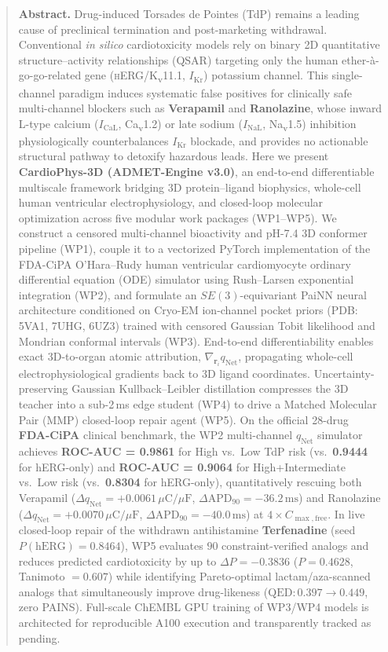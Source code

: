 \documentclass[10pt,twocolumn,letterpaper]{article}
\newcommand{\qnet}{q_{\mathrm{Net}}}
\newcommand{\cmax}{C_{\max,\mathrm{free}}}
\newcommand{\apd}{\mathrm{APD}_{90}}
\begin{document}
\begin{@twocolumnfalse}
  \begin{quote}
    \small\noindent\textbf{\color{InkSlate}Abstract.}
    Drug-induced Torsades de Pointes (TdP) remains a leading cause of preclinical termination and post-marketing withdrawal. Conventional \textit{in silico} cardiotoxicity models rely on binary 2D quantitative structure--activity relationships (QSAR) targeting only the human ether-\`{a}-go-go-related gene (\textsc{hERG}/K\textsubscript{v}11.1, $I_{\mathrm{Kr}}$) potassium channel. This single-channel paradigm induces systematic false positives for clinically safe multi-channel blockers such as \textbf{Verapamil} and \textbf{Ranolazine}, whose inward L-type calcium ($I_{\mathrm{CaL}}$, Ca\textsubscript{v}1.2) or late sodium ($I_{\mathrm{NaL}}$, Na\textsubscript{v}1.5) inhibition physiologically counterbalances $I_{\mathrm{Kr}}$ blockade, and provides no actionable structural pathway to detoxify hazardous leads. Here we present \textbf{CardioPhys-3D (ADMET-Engine v3.0)}, an end-to-end differentiable multiscale framework bridging 3D protein--ligand biophysics, whole-cell human ventricular electrophysiology, and closed-loop molecular optimization across five modular work packages (WP1--WP5). We construct a censored multi-channel bioactivity and pH-7.4 3D conformer pipeline (WP1), couple it to a vectorized PyTorch implementation of the FDA-CiPA O'Hara--Rudy human ventricular cardiomyocyte ordinary differential equation (ODE) simulator using Rush--Larsen exponential integration (WP2), and formulate an $SE(3)$-equivariant PaiNN neural architecture conditioned on Cryo-EM ion-channel pocket priors (PDB: 5VA1, 7UHG, 6UZ3) trained with censored Gaussian Tobit likelihood and Mondrian conformal intervals (WP3). End-to-end differentiability enables exact 3D-to-organ atomic attribution, $\nabla_{\mathbf{r}_i}\qnet$, propagating whole-cell electrophysiological gradients back to 3D ligand coordinates. Uncertainty-preserving Gaussian Kullback--Leibler distillation compresses the 3D teacher into a sub-2\,ms edge student (WP4) to drive a Matched Molecular Pair (MMP) closed-loop repair agent (WP5). On the official 28-drug \textbf{FDA-CiPA} clinical benchmark, the WP2 multi-channel $\qnet$ simulator achieves \textbf{ROC-AUC = 0.9861} for High vs.\ Low TdP risk (vs.\ \textbf{0.9444} for hERG-only) and \textbf{ROC-AUC = 0.9064} for High+Intermediate vs.\ Low risk (vs.\ \textbf{0.8304} for hERG-only), quantitatively rescuing both Verapamil ($\Delta\qnet = +0.0061\,\mu\mathrm{C}/\mu\mathrm{F}$, $\Delta\apd = -36.2\,\mathrm{ms}$) and Ranolazine ($\Delta\qnet = +0.0070\,\mu\mathrm{C}/\mu\mathrm{F}$, $\Delta\apd = -40.0\,\mathrm{ms}$) at $4\times\cmax$. In live closed-loop repair of the withdrawn antihistamine \textbf{Terfenadine} (seed $P(\mathrm{hERG}) = 0.8464$), WP5 evaluates $90$ constraint-verified analogs and reduces predicted cardiotoxicity by up to $\Delta P = -0.3836$ ($P = 0.4628$, Tanimoto $= 0.607$) while identifying Pareto-optimal lactam/aza-scanned analogs that simultaneously improve drug-likeness ($\mathrm{QED}: 0.397 \to 0.449$, zero PAINS). Full-scale ChEMBL GPU training of WP3/WP4 models is architected for reproducible A100 execution and transparently tracked as pending.
  \end{quote}


\end{@twocolumnfalse}
\end{document}
